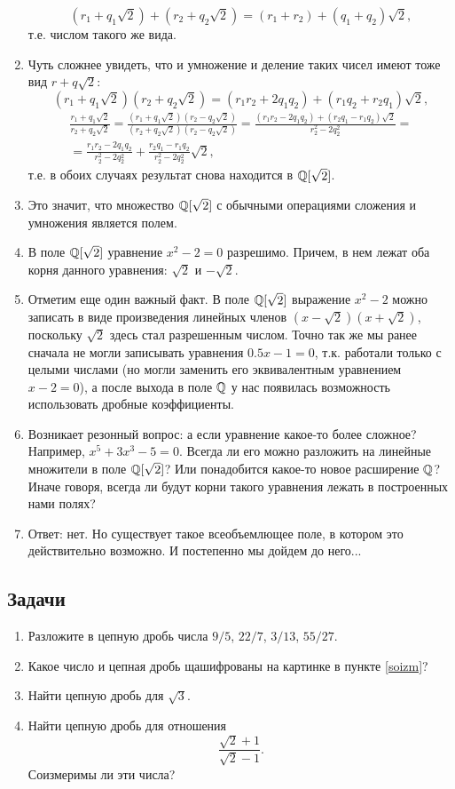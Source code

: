 \begin{enumerate}
$$
(r_1+q_1\sqrt 2)+(r_2+q_2\sqrt 2)=(r_1+r_2)+(q_1+q_2)\sqrt 2,
$$
т.е. числом такого же вида.
\item Чуть сложнее увидеть, что и умножение и деление таких чисел имеют тоже вид $r+q\sqrt 2$:
$$
(r_1+q_1\sqrt 2)(r_2+q_2\sqrt 2)=(r_1r_2+2q_1q_2)+(r_1q_2+r_2q_1)\sqrt 2,
$$
\begin{multline*}
\frac{r_1+q_1\sqrt 2}{r_2+q_2\sqrt 2}=\frac{(r_1+q_1\sqrt 2)(r_2-q_2\sqrt 2)}{(r_2+q_2\sqrt 2)(r_2-q_2\sqrt 2)}=
\frac{(r_1r_2-2q_1q_2)+(r_2q_1-r_1q_2)\sqrt 2}{r_2^2-2q_2^2}= \\
=\frac{r_1r_2-2q_1q_2}{r_2^2-2q_2^2}+\frac{r_2q_1-r_1q_2}{r_2^2-2q_2^2}\sqrt 2,
\end{multline*}
т.е. в обоих случаях результат снова находится в $\mathbb Q[\sqrt 2]$.
\item Это значит, что множество $\mathbb Q[\sqrt 2]$ с обычными операциями сложения и умножения является полем.
\item В поле $\mathbb Q[\sqrt 2]$ уравнение $x^2-2=0$ разрешимо. Причем, в нем лежат оба корня данного уравнения: $\sqrt 2$ и $-\sqrt 2$.
\item Отметим еще один важный факт. В поле $\mathbb Q[\sqrt 2]$ выражение $x^2-2$ можно записать в виде произведения линейных членов $(x-\sqrt 2)(x+\sqrt 2)$, поскольку $\sqrt 2$ здесь стал разрешенным числом. Точно так же мы ранее сначала не могли записывать уравнения $0.5x-1=0$, т.к. работали только с целыми числами (но могли заменить его эквивалентным уравнением $x-2=0$), а после выхода в поле $\mathbb Q$ у нас появилась возможность использовать дробные коэффициенты.
\item Возникает резонный вопрос: а если уравнение какое-то более сложное? Например, $x^5+3x^3-5=0$. Всегда ли его можно разложить на линейные множители в поле $\mathbb Q[\sqrt 2]$? Или понадобится какое-то новое расширение $\mathbb Q$?
Иначе говоря, всегда ли будут корни такого уравнения лежать в построенных нами полях?
\item Ответ: нет. Но существует такое всеобъемлющее поле, в котором это действительно возможно. И постепенно мы дойдем до него...
\end{enumerate}


\subsection*{Задачи}

\begin{enumerate}
\item Разложите в цепную дробь числа $9/5$, $22/7$, $3/13$, $55/27$.
\item Какое число и цепная дробь щашифрованы на картинке в пункте \ref{soizm}?
\item Найти цепную дробь для $\sqrt 3$.
\item Найти цепную дробь для отношения 
$$
\frac{\sqrt 2+1}{\sqrt 2-1}.
$$
Соизмеримы ли эти числа?
\end{enumerate}




